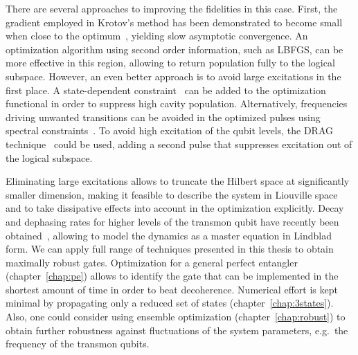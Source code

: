 There are several approaches to improving the fidelities in this case.
First, the gradient employed in Krotov's method has been demonstrated to
become small when close to the optimum~\cite{MachnesPRA2011}, yielding slow
asymptotic convergence. An optimization algorithm using second order
information, such as LBFGS, can be more effective in this region, allowing to
return population fully to the logical subspace. However, an even better
approach is to avoid large excitations in the first place.
A state-dependent constraint~\cite{PalaoPRA08} can be added to the optimization
functional in order to suppress high cavity population. Alternatively,
frequencies driving unwanted transitions can be avoided in the optimized pulses
using spectral constraints~\cite{JosePRA13, ReichJMO2014}. To avoid high
excitation of the qubit levels, the DRAG technique~\cite{MotzoiPRL2009,
MotzoiPRL2009} could be used, adding a second pulse that suppresses excitation
out of the logical subspace.

Eliminating large excitations allows to truncate the Hilbert space at
significantly smaller dimension, making it feasible to describe the
system in Liouville space and to take dissipative effects into account in the
optimization explicitly. Decay and dephasing rates for higher levels of the
transmon qubit have recently been obtained~\cite{PetererPRL2015}, allowing to
model the dynamics as a master equation in Lindblad form.
We can apply full range of techniques presented in this thesis to obtain
maximally robust gates. Optimization for a general perfect entangler
(chapter~\ref{chap:pe}) allows to identify the gate that can be implemented in
the shortest amount of time in order to beat decoherence. Numerical effort is
kept minimal by propagating only a reduced set of states
(chapter~\ref{chap:3states}).  Also, one could consider using ensemble
optimization (chapter~\ref{chap:robust}) to obtain further robustness against
fluctuations of the system parameters, e.g.\ the frequency of the transmon
qubits.

